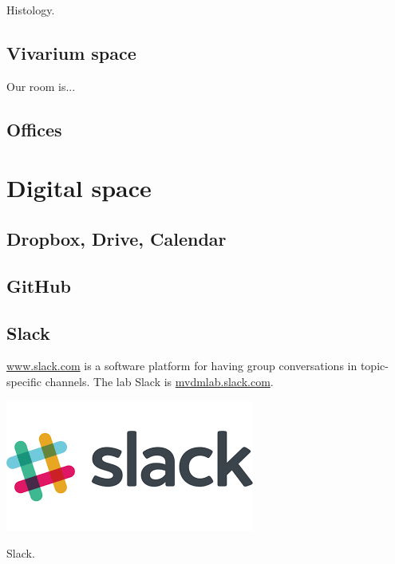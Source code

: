 \documentclass{tufte-book}
\begin{document}
Histology.

\section{Vivarium space}

Our room is...

\section{Offices}


\chapter{Digital space}

\section{Dropbox, Drive, Calendar}

\section{GitHub}

\section{Slack}

\href{Slack}{www.slack.com} is a software platform for having group
conversations in topic-specific channels. The lab Slack is
\url{mvdmlab.slack.com}.

\begin{marginfigure}%
  \includegraphics[width=\linewidth]{images/slack.png}
  \caption{Slack.}
  \label{fig:slack}
\end{marginfigure}
\end{document}
